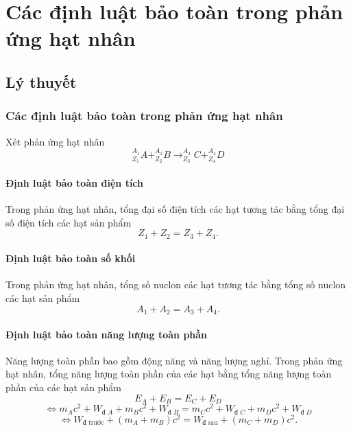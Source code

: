 
\chapter[Các định luật bảo toàn\\ trong phản ứng hạt nhân]{Các định luật bảo toàn trong phản ứng hạt nhân}
\section{Lý thuyết}

\subsection{Các định luật bảo toàn trong phản ứng hạt nhân}
Xét phản ứng hạt nhân
\begin{equation}
	^{A_1}_{Z_1}A + ^{A_2}_{Z_2}B \rightarrow ^{A_3}_{Z_3}C + ^{A_4}_{Z_4}D
\end{equation}
\subsubsection{Định luật bảo toàn điện tích}
Trong phản ứng hạt nhân, tổng đại số điện tích các hạt tương tác bằng tổng đại số điện tích các hạt sản phẩm
\begin{equation}
	Z_1+Z_2=Z_3+Z_4.
\end{equation}
\subsubsection{Định luật bảo toàn số khối}
Trong phản ứng hạt nhân, tổng số nuclon các hạt tương tác bằng tổng số nuclon các hạt sản phẩm
\begin{equation}
	A_1+A_2=A_3+A_4.
\end{equation}

\subsubsection{Định luật bảo toàn năng lượng toàn phần}
Năng lượng toàn phần bao gồm động năng và năng lượng nghỉ. Trong phản ứng hạt nhân, tổng năng lượng toàn phần của các hạt bằng tổng năng lượng toàn phần của các hạt sản phẩm
\begin{equation}
	E_A+E_B=E_C+E_D
\end{equation}
\begin{equation}
	\Leftrightarrow m_Ac^2+ W_{\textrm{đ }A} + m_Bc^2+W_{\textrm{đ }B} = m_Cc^2+ W_{\textrm{đ }C} + m_Dc^2+W_{\textrm{đ }D}
\end{equation}
\begin{equation}
	\Leftrightarrow W_\textrm{đ trước} + (m_A+m_B)c^2 = W_\textrm{đ sau} + (m_C+m_D)c^2 .
\end{equation}

